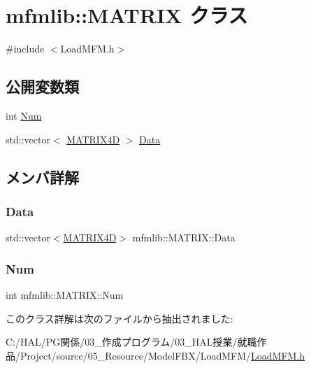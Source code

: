 \hypertarget{classmfmlib_1_1_m_a_t_r_i_x}{}\section{mfmlib\+:\+:M\+A\+T\+R\+IX クラス}
\label{classmfmlib_1_1_m_a_t_r_i_x}


{\ttfamily \#include $<$Load\+M\+F\+M.\+h$>$}

\subsection*{公開変数類}
\begin{DoxyCompactItemize}
\item 
int \mbox{\hyperlink{classmfmlib_1_1_m_a_t_r_i_x_a907c35d2fa39471508fb1fb6ce95ab04}{Num}}
\item 
std\+::vector$<$ \mbox{\hyperlink{structmfmlib_1_1_m_a_t_r_i_x4_d}{M\+A\+T\+R\+I\+X4D}} $>$ \mbox{\hyperlink{classmfmlib_1_1_m_a_t_r_i_x_abfb3b3bad3976f296250d669a302e5ee}{Data}}
\end{DoxyCompactItemize}


\subsection{メンバ詳解}
\mbox{\label{classmfmlib_1_1_m_a_t_r_i_x_abfb3b3bad3976f296250d669a302e5ee}} 
\subsubsection{\texorpdfstring{Data}{Data}}
{\footnotesize\ttfamily std\+::vector$<$\mbox{\hyperlink{structmfmlib_1_1_m_a_t_r_i_x4_d}{M\+A\+T\+R\+I\+X4D}}$>$ mfmlib\+::\+M\+A\+T\+R\+I\+X\+::\+Data}

\mbox{\label{classmfmlib_1_1_m_a_t_r_i_x_a907c35d2fa39471508fb1fb6ce95ab04}} 
\subsubsection{\texorpdfstring{Num}{Num}}
{\footnotesize\ttfamily int mfmlib\+::\+M\+A\+T\+R\+I\+X\+::\+Num}



このクラス詳解は次のファイルから抽出されました\+:\begin{DoxyCompactItemize}
\item 
C\+:/\+H\+A\+L/\+P\+G関係/03\+\_\+作成プログラム/03\+\_\+\+H\+A\+L授業/就職作品/\+Project/source/05\+\_\+\+Resource/\+Model\+F\+B\+X/\+Load\+M\+F\+M/\mbox{\hyperlink{_load_m_f_m_8h}{Load\+M\+F\+M.\+h}}\end{DoxyCompactItemize}
